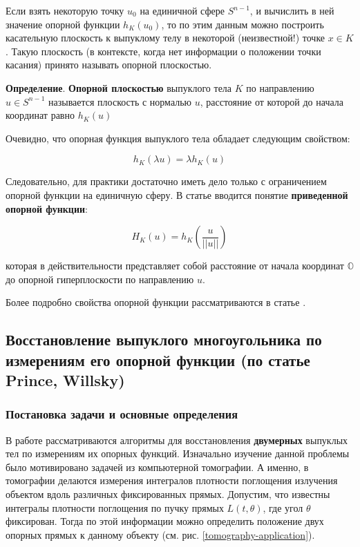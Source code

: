 \documentclass[a4paper,12pt, titlepage]{article}
\begin{document}
Если взять некоторую точку $u_{0}$ на единичной сфере $S^{n - 1}$, и вычислить
в ней значение опорной функции $h_{K}(u_{0})$, то по этим данным можно
построить касательную плоскость к выпуклому телу в некоторой (неизвестной!)
точке $x \in K$. Такую плоскость (в контексте, когда нет информации о положении
точки касания) принято называть опорной плоскостью.

\begin{flushleft}
 \textbf{Определение}. \textbf{Опорной плоскостью} выпуклого тела $K$ по
 направлению $u \in S^{n - 1}$ называется плоскость с нормалью $u$, расстояние
 от которой до начала координат равно $h_{K}(u)$
\end{flushleft}

Очевидно, что опорная функция выпуклого тела обладает следующим свойством:

$$h_{K}(\lambda u) = \lambda h_{K}(u)$$

Следовательно, для практики достаточно иметь дело только с ограничением опорной
функции на единичную сферу. В статье \cite{journals/jmiv/KarlKVW96} вводится
понятие \textbf{приведенной опорной функции}:

$$H_{K} (u) = h_{K} (\frac{u}{||u||})$$

которая в действительности представляет собой расстояние от начала координат
$\mathbb{O}$ до опорной гиперплоскости по направлению $u$.

Более подробно свойства опорной функции рассматриваются в статье
\cite{journals/cviu/GhoshK98}.


\newpage
\subsection{Восстановление выпуклого многоугольника по измерениям его опорной
функции (по статье Prince, Willsky)}

\subsubsection{Постановка задачи и основные определения}

В работе \cite[Prince - Willsky (1990)]{journals/pami/PrinceW90}
рассматриваются алгоритмы для восстановления \textbf{двумерных} выпуклых тел по
измерениям их опорных функций. Изначально изучение данной проблемы было
мотивировано задачей из компьютерной томографии. А именно, в томографии
делаются измерения интегралов плотности поглощения излучения объектом вдоль
различных фиксированных прямых. Допустим, что известны интегралы плотности
поглощения по пучку прямых $L(t, \theta)$, где угол $\theta$ фиксирован. Тогда
по этой информации можно определить положение двух опорных прямых к данному
объекту (см. рис. \ref{tomography-application}).
\end{document}
